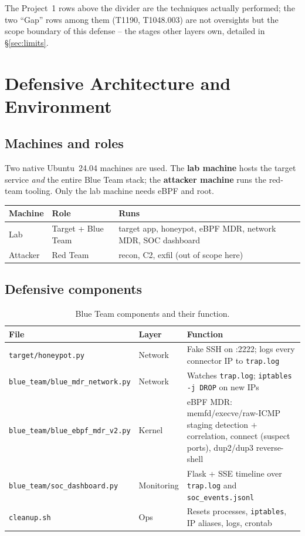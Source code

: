 \documentclass[11pt]{article}
\newcommand{\co}[1]{\texttt{#1}}
\begin{document}
The Project~1 rows above the divider are the techniques actually performed;
the two ``Gap'' rows among them (T1190, T1048.003) are not oversights but the
scope boundary of this defense -- the stages other layers own, detailed in \S\ref{sec:limits}.

\section{Defensive Architecture and Environment}

\subsection{Machines and roles}
Two native Ubuntu~24.04 machines are used. The \textbf{lab machine} hosts the
target service \emph{and} the entire Blue Team stack; the \textbf{attacker
machine} runs the red-team tooling. Only the lab machine needs eBPF and root.

\begin{center}
\begin{tabularx}{\linewidth}{@{}l l Y@{}}
\toprule
\textbf{Machine} & \textbf{Role} & \textbf{Runs}\\
\midrule
Lab & Target + Blue Team & target app, honeypot, eBPF MDR, network MDR, SOC dashboard\\
Attacker & Red Team & recon, C2, exfil (out of scope here)\\
\bottomrule
\end{tabularx}
\end{center}

\subsection{Defensive components}
\begin{table}[h]
\centering
\caption{Blue Team components and their function.}
\label{tab:components}
\small
\begin{tabularx}{\linewidth}{@{}l l Y@{}}
\toprule
\textbf{File} & \textbf{Layer} & \textbf{Function}\\
\midrule
\co{target/honeypot.py} & Network & Fake SSH on :2222; logs every connector IP to \co{trap.log}\\
\co{blue\_team/blue\_mdr\_network.py} & Network & Watches \co{trap.log}; \co{iptables -j DROP} on new IPs\\
\co{blue\_team/blue\_ebpf\_mdr\_v2.py} & Kernel & eBPF MDR: memfd/execve/raw-ICMP staging detection $+$ correlation, connect (suspect ports), dup2/dup3 reverse-shell\\
\co{blue\_team/soc\_dashboard.py} & Monitoring & Flask + SSE timeline over \co{trap.log} and \co{soc\_events.jsonl}\\
\co{cleanup.sh} & Ops & Resets processes, \co{iptables}, IP aliases, logs, crontab\\
\bottomrule
\end{tabularx}
\end{table}
\end{document}
